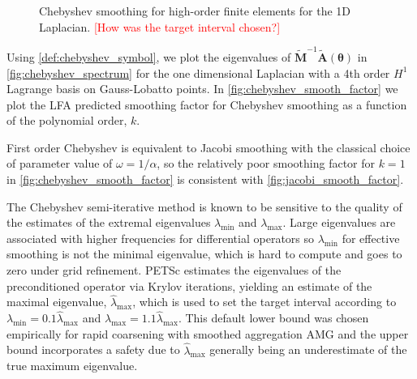 \documentclass[review]{siamart190516}
\newcommand{\todo}[1]{\textcolor{red}{[#1]}}
\begin{document}
\begin{figure}[!tbp]
  \centering
  \hfill
  \caption{Chebyshev smoothing for high-order finite elements for the 1D Laplacian. \todo{How was the target interval chosen?}}
\end{figure}

Using \cref{def:chebyshev_symbol}, we plot the eigenvalues of $\tilde{\mathbf{M}}^{-1} \tilde{\mathbf{A}} \left( \boldsymbol{\theta} \right)$ in \cref{fig:chebyshev_spectrum} for the one dimensional Laplacian with a 4th order $H^1$ Lagrange basis on Gauss-Lobatto points.
In \cref{fig:chebyshev_smooth_factor} we plot the LFA predicted smoothing factor for Chebyshev smoothing as a function of the polynomial order, $k$.

First order Chebyshev is equivalent to Jacobi smoothing with the classical choice of parameter value of $\omega = 1 / \alpha$, so the relatively poor smoothing factor for $k = 1$ in \cref{fig:chebyshev_smooth_factor} is consistent with \cref{fig:jacobi_smooth_factor}.

The Chebyshev semi-iterative method is known to be sensitive to the quality of the estimates of the extremal eigenvalues $\lambda_{\text{min}}$ and $\lambda_{\text{max}}$.
Large eigenvalues are associated with higher frequencies for differential operators so $\lambda_{\min}$ for effective smoothing is not the minimal eigenvalue, which is hard to compute and goes to zero under grid refinement.
PETSc \cite{petsc-user-ref} estimates the eigenvalues of the preconditioned operator via Krylov iterations, yielding an estimate of the maximal eigenvalue, $\hat{\lambda}_{\text{max}}$, which is used to set the target interval according to $\lambda_{\text{min}} = 0.1 \hat{\lambda}_{\text{max}}$ and $\lambda_{\text{max}} = 1.1 \hat{\lambda}_{\text{max}}$.
This default lower bound was chosen empirically for rapid coarsening with smoothed aggregation AMG and the upper bound incorporates a safety due to $\hat{\lambda}_{\max}$ generally being an underestimate of the true maximum eigenvalue.
\end{document}
